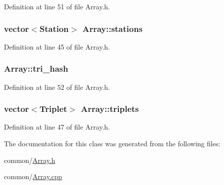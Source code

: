 Definition at line 51 of file Array.h.

\hypertarget{classArray_a8dc3e704ff95584d28adbcedf1774b8b}{
\subsubsection[{stations}]{\setlength{\rightskip}{0pt plus 5cm}vector$<${\bf Station}$>$ {\bf Array::stations}}}
\label{classArray_a8dc3e704ff95584d28adbcedf1774b8b}


Definition at line 45 of file Array.h.

\hypertarget{classArray_ab2a4d4becfb20178cf01e1fd885195c6}{
\subsubsection[{tri\_\-hash}]{ {\bf Array::tri\_\-hash}}}
\label{classArray_ab2a4d4becfb20178cf01e1fd885195c6}


Definition at line 52 of file Array.h.

\hypertarget{classArray_aebc67b133d4e00adee3fc6afb3e2a873}{
\subsubsection[{triplets}]{\setlength{\rightskip}{0pt plus 5cm}vector$<${\bf Triplet}$>$ {\bf Array::triplets}}}
\label{classArray_aebc67b133d4e00adee3fc6afb3e2a873}


Definition at line 47 of file Array.h.



The documentation for this class was generated from the following files:\begin{DoxyCompactItemize}
\item 
common/\hyperlink{Array_8h}{Array.h}\item 
common/\hyperlink{Array_8cpp}{Array.cpp}\end{DoxyCompactItemize}
